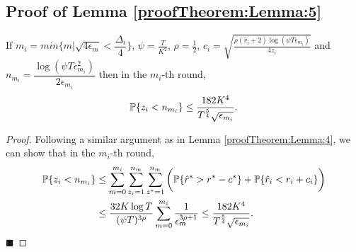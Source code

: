 \subsection{Proof of Lemma \ref{proofTheorem:Lemma:5}}
\label{App:Lemma:5}
\begin{customlem}{5}
If $m_i = min\lbrace m|\sqrt{4\epsilon_{m} } < \dfrac{\Delta_i}{4} \rbrace $, $\psi=\frac{T}{ K^2}$, $\rho=\frac{1}{2}$, $c_{i} =\sqrt{\frac{\rho (\hat{v}_i + 2)\log (\psi T\epsilon_{m_{i}})}{4 z_i}}$ and $n_{m_i}=\dfrac{\log{(\psi T\epsilon_{m_{i}}^{2})}}{2\epsilon_{m_{i}}}$ then in the $m_i$-th round, 
\begin{align*}
\mathbb{P}\lbrace z_i < n_{m_i} \rbrace \leq \dfrac{182 K^4}{T^{\frac{5}{4}}\sqrt{\epsilon_{m_i}}}.
\end{align*}
\end{customlem}

\begin{proof}
Following a similar argument as in Lemma \ref{proofTheorem:Lemma:4}, we can show that in the $m_i$-th round,
\begin{align*}
\mathbb{P}\lbrace z_i < n_{m_i} \rbrace &\leq \sum_{m=0}^{m_i}\sum_{z_i =1}^{n_{m}}\sum_{z^* =1}^{n_{m}}\bigg(\mathbb{P}\lbrace \hat{r}^* > r^* - c^{*}\rbrace + \mathbb{P}\lbrace \hat{r}_i < r_i + c_i\rbrace\bigg) \\
&\leq \dfrac{32K\log T}{(\psi T)^{3\rho}}\sum_{m=0}^{m_i}\dfrac{1}{\epsilon_{m}^{3\rho + 1}}\leq \dfrac{182 K^4}{T^{\frac{5}{4}}\sqrt{\epsilon_{m_i}}}.
\end{align*}
\hfill $\blacksquare$	
\end{proof}

